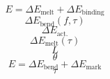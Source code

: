 \documentclass{article}
\begin{document}
\[E = \Delta E_\text{melt} + \Delta E_\text{binding}\]
\[\Delta E_\text{bend}(f,\tau)\]
\[\Delta E_\text{act.}\]
\[\Delta E_\text{melt}(\tau)\]
\[L\]
\[\theta\]
\[E = \Delta E_\text{bend} + \Delta E_\text{mark}\]
\[\tau\]
\end{document}
